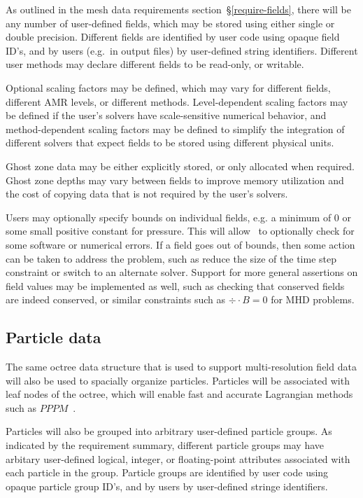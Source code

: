 \documentclass[10pt]{article}
\begin{document}
As outlined in the mesh data requirements
section~\S\ref{require-fields}, there will be any number of
user-defined fields, which may be stored using either single or double
precision.  Different fields are identified by user code using 
opaque field ID's, and by users (e.g.~in output files) by
user-defined string identifiers.  Different user methods may
declare different fields to be read-only, or writable.

Optional scaling factors may be defined, which may vary for different
fields, different AMR levels, or different methods.  Level-dependent
scaling factors may be defined if the user's solvers have
scale-sensitive numerical behavior, and method-dependent scaling
factors may be defined to simplify the integration of different
solvers that expect fields to be stored using different physical
units.

Ghost zone data may be either explicitly stored, or only allocated
when required.  Ghost zone depths may vary between fields to improve
memory utilization and the cost of copying data that is not required
by the user's solvers.  

Users may optionally specify bounds on individual fields, e.g. a
minimum of $0$ or some small positive constant for pressure.  This
will allow \cello\ to optionally check for some software or numerical
errors.  If a field goes out of bounds, then some action can be taken
to address the problem, such as reduce the size of the time step
constraint or switch to an alternate solver.  Support for more general
assertions on field values may be implemented as well, such as checking
that conserved fields are indeed conserved, or similar constraints
such as $\div\cdot B=0$ for MHD problems.

\subsection{Particle data} \label{ss:design-particles}

The same octree data structure that is used to support
multi-resolution field data will also be used to spacially organize
particles.  Particles will be associated with leaf nodes of the
octree, which will enable fast and accurate Lagrangian methods such
as $PPPM$~\cite{HoEa88}.

Particles will also be grouped into arbitrary user-defined particle
groups.  As indicated by the requirement summary, different particle
groups may have arbitary user-defined logical, integer, or
floating-point attributes associated with each particle in the group.
Particle groups are identified by user code using opaque particle
group ID's, and by users by user-defined stringe identifiers.
\end{document}
